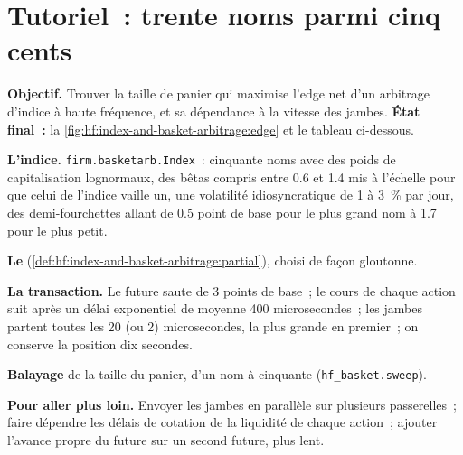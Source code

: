 \section{Tutoriel~: trente noms parmi cinq cents}\label{tut:hf:index-and-basket-arbitrage:tut}

\begin{tutorial}
\textbf{Objectif.} Trouver la taille de panier qui maximise l'edge net d'un arbitrage d'indice à haute fréquence, et sa dépendance à la vitesse des
jambes. \textbf{État final~:} la \cref{fig:hf:index-and-basket-arbitrage:edge} et le tableau ci-dessous.
\begin{tutsteps}
\item \textbf{L'indice.} \texttt{firm.basketarb.Index}~: cinquante noms avec des poids de capitalisation lognormaux, des bêtas compris entre 0.6 et 1.4 mis à l'échelle pour que
celui de l'indice vaille un, une volatilité idiosyncratique de 1 à 3~\% par jour, des demi-fourchettes allant de 0.5 point de base pour le plus grand nom à 1.7 pour le plus petit.
\item \textbf{Le } (\cref{def:hf:index-and-basket-arbitrage:partial}), choisi de façon gloutonne.
\label{lst:hf:index-and-basket-arbitrage:partial}
\item \textbf{La transaction.} Le future saute de 3 points de base~; le cours de chaque action suit après un délai exponentiel de moyenne 400 microsecondes~; les
jambes partent toutes les 20 (ou 2) microsecondes, la plus grande en premier~; on conserve la position dix secondes.
\label{lst:hf:index-and-basket-arbitrage:trade}
\item \textbf{Balayage} de la taille du panier, d'un nom à cinquante (\texttt{hf\_basket.sweep}).
\end{tutsteps}
\textbf{Pour aller plus loin.} Envoyer les jambes en parallèle sur plusieurs passerelles~; faire dépendre les délais de cotation de la liquidité de chaque action~; ajouter
l'avance propre du future sur un second future, plus lent.
\end{tutorial}

